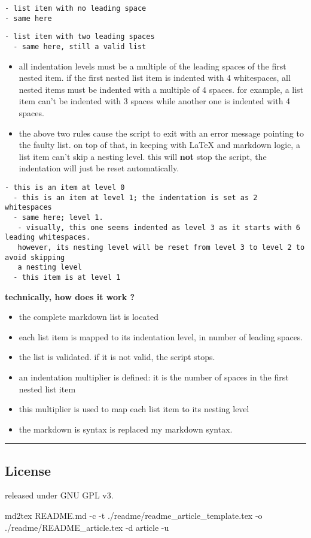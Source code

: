 \documentclass[a4paper, 12pt, twoside]{article}
\begin{document}
\begin{Verbatim}[breaklines=true]
- list item with no leading space
- same here
\end{Verbatim}

\begin{Verbatim}[breaklines=true]
  - list item with two leading spaces
  - same here, still a valid list
\end{Verbatim}

\begin{itemize}
\item all indentation levels must be a multiple of the leading spaces of the first nested item. if the first nested list item is indented with 4 whitespaces, all nested items must be indented with a multiple of 4 spaces. for example, a list item can't be indented with 3 spaces while another one is indented with 4 spaces. 
\end{itemize}

\begin{itemize}
\item the above two rules cause the script to exit with an error message pointing to the faulty list. on top of that, in keeping with LaTeX and markdown logic, a list item can't skip a nesting level. this will \textbf{not} stop the script, the indentation will just be reset automatically. 
\end{itemize}

\begin{Verbatim}[breaklines=true]
- this is an item at level 0
  - this is an item at level 1; the indentation is set as 2 whitespaces
  - same here; level 1.
   - visually, this one seems indented as level 3 as it starts with 6 leading whitespaces.
   however, its nesting level will be reset from level 3 to level 2 to avoid skipping
   a nesting level
  - this item is at level 1
\end{Verbatim}

\textbf{technically, how does it work ?}

\begin{itemize}
\item the complete markdown list is located
\item each list item is mapped to its indentation level, in number of leading spaces.
\item the list is validated. if it is not valid, the script stops.
\item an indentation multiplier is defined: it is the number of spaces in the first nested list item
\item this multiplier is used to map each list item to its nesting level
\item the markdown is syntax is replaced my markdown syntax. 
\end{itemize}

\par\noindent\rule{\linewidth}{0.4pt}
\subsection{License}

released under GNU GPL v3.

md2tex README.md -c -t ./readme/readme\_article\_template.tex -o ./readme/README\_article.tex -d article -u


\clearpage
\tableofcontents
\end{document}
